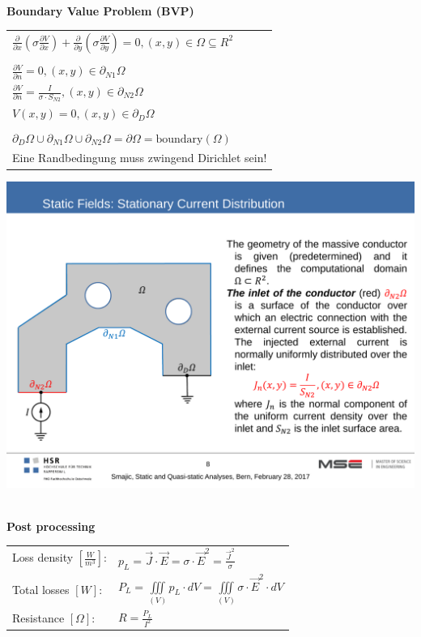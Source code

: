 \textbf{\\ Boundary Value Problem (BVP)\\}
\begin{minipage}[lt]{11cm}
	\begin{tabular}{l}
		\(\displaystyle \frac{\partial}{\partial x}\left(\sigma \frac{\partial V}{\partial x}\right) +\frac{\partial}{\partial y}\left(\sigma \frac{\partial V}{\partial y}\right)
		= 0, \left(x,y\right) \in \Omega \subseteq R^2 \) \\ \\
		\(\displaystyle \frac{\partial V}{\partial n} = 0, \left(x,y\right) \in \partial_{N1} \Omega\) \\
		\(\displaystyle \frac{\partial V}{\partial n} = \frac{I}{\sigma \cdot S_{N2}}, \left(x,y\right) \in \partial_{N2} \Omega\) \\
		\(\displaystyle V\left(x,y\right) = 0, \left(x,y\right) \in \partial_D \Omega\)\\ \\
		
		\(\displaystyle \partial_D\Omega\cup\partial_{N1}\Omega\cup\partial_{N2}\Omega = \partial\Omega = \text{boundary}(\Omega) \)\\
		Eine Randbedingung muss zwingend Dirichlet sein!
	\end{tabular}
\end{minipage}
\begin{minipage}[rt]{8cm}
	\includegraphics[width=.8\textwidth]{./images/CurrentDistribution.pdf}
\end{minipage}

\textbf{\\ Post processing \\ }
\begin{tabular}{ll}
	Loss density $\left[\frac{W}{m^3}\right]$: & \(\displaystyle p_L = \vec{J} \cdot \vec{E} = \sigma \cdot \vec{E}^2 = \frac{\vec{J}^2}{\sigma} \)\\
	Total losses $[W]$: & \(\displaystyle P_L = \iiint\limits_{\left(V\right)} p_L \cdot dV = \iiint\limits_{\left(V\right)} \sigma \cdot \vec{E}^2 \cdot dV \) \\
	Resistance $[\Omega]$: & \(\displaystyle R = \frac{P_L}{I^2}\) \\
\end{tabular}